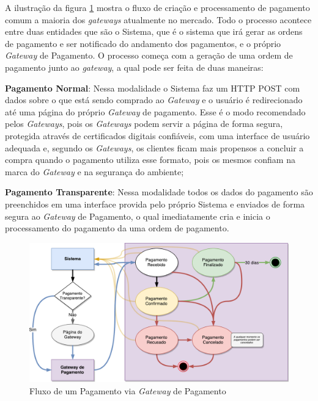 A ilustração da figura \ref{fig:gateway} mostra o fluxo de criação e processamento de pagamento comum a maioria dos \emph{gateways} atualmente no mercado. Todo o processo acontece entre duas entidades que são o Sistema, que é o sistema que irá gerar as ordens de pagamento e ser notificado do andamento dos pagamentos, e o próprio \emph{Gateway} de Pagamento. O processo começa com a geração de uma ordem de pagamento junto ao \emph{gateway}, a qual pode ser feita de duas maneiras:

\begin{lista}
	\item \textbf{Pagamento Normal}: Nessa modalidade o Sistema faz um HTTP POST com dados sobre o que está sendo comprado ao \emph{Gateway} e o usuário é redirecionado até uma página do próprio \emph{Gateway} de pagamento. Esse é o modo recomendado pelos \emph{Gateways}, pois os \emph{Gateways} podem servir a página de forma segura, protegida através de certificados digitais confiáveis, com uma interface de usuário adequada e, segundo os \emph{Gateways}, os clientes ficam mais propensos a concluir a compra quando o pagamento utiliza esse formato, pois os mesmos confiam na marca do \emph{Gateway} e na segurança do ambiente;
	\item \textbf{Pagamento Transparente}: Nessa modalidade todos os dados do pagamento são preenchidos em uma interface provida pelo próprio Sistema e enviados de forma segura ao \emph{Gateway} de Pagamento, o qual imediatamente cria e inicia o processamento do pagamento da uma ordem de pagamento.
\end{lista}

\begin{figure}[H]
	\caption{\label{fig:gateway}Fluxo de um Pagamento via \emph{Gateway} de Pagamento}
    \centering
    \includegraphics[scale=0.575]{imagens/processo_gateway.pdf}
\end{figure}

